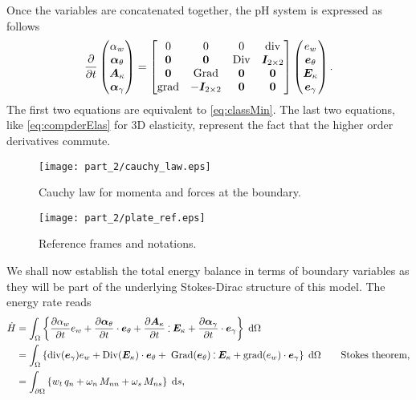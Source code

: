 Once the variables are concatenated together, the pH system is expressed as follows
\begin{equation}\label{eq:pHdyn_Min}
\diffp{}{t}
\begin{pmatrix}
\alpha_w \\
\bm\alpha_\theta \\
\bm{A}_\kappa \\
\bm\alpha_{\gamma} \\
\end{pmatrix} = 
\begin{bmatrix}
0  & 0  & 0  & \div \\
\bm{0} & \bm{0} &  \Div & \bm{I}_{2 \times 2}\\
\bm{0}  & \Grad  & \bm{0}  & \bm{0}\\
\grad & -\bm{I}_{2 \times 2} &  \bm{0} & \bm{0} \\
\end{bmatrix}
\begin{pmatrix}
e_w \\
\bm{e}_{\theta} \\
\bm{E}_{\kappa} \\
\bm{e}_{\gamma} \\
\end{pmatrix}.
\end{equation}
The first two equations are equivalent to \eqref{eq:classMin}. The last two equations, like \eqref{eq:compderElas} for 3D elasticity, represent the fact that the higher order derivatives commute.
\begin{figure}[t]
	\centering
	\texttt{[image: part\_2/cauchy\_law.eps]}
	\caption{Cauchy law for momenta and forces at the boundary.}
	\label{fig:Cauchy_law}
\end{figure}
\begin{figure}[tb]
	\centering
	\texttt{[image: part\_2/plate\_ref.eps]}
	\caption{Reference frames and notations.}
	\label{fig:plate_ref}
\end{figure}
We shall now establish the total energy balance in terms of boundary variables as they will  be part of the underlying Stokes-Dirac structure of this model. The energy rate reads
\begin{equation}
\label{eq:enrateMin}
\begin{aligned}
\dot{H}&= \int_{\Omega} \left\{ \diffp{\alpha_w}{t} e_w  + \diffp{\bm\alpha_\theta}{t} \cdot \bm{e}_\theta + \diffp{\bm{A}_{\kappa}}{t} \cddot \bm{E}_{\kappa}  + \diffp{\bm\alpha_{\gamma}}{t} \cdot \bm{e}_{\gamma} \right\} \d\Omega\\
&= \int_{\Omega} \left\{ \div(\bm{e}_{\gamma}) e_w  + \Div(\bm{E}_{\kappa}) \cdot \bm{e}_\theta + \; \Grad(\bm{e}_{\theta}) \cddot \bm{E}_{\kappa}  + \grad (e_w) \cdot \bm{e}_{\gamma} \right\} \d\Omega \qquad \text{Stokes theorem,} \\
&= \int_{\partial \Omega} \left\{ w_t \, q_n  + \omega_n \, M_{nn} + \omega_s \, M_{ns} \right\} \d{s},  \\
\end{aligned}
\end{equation}
